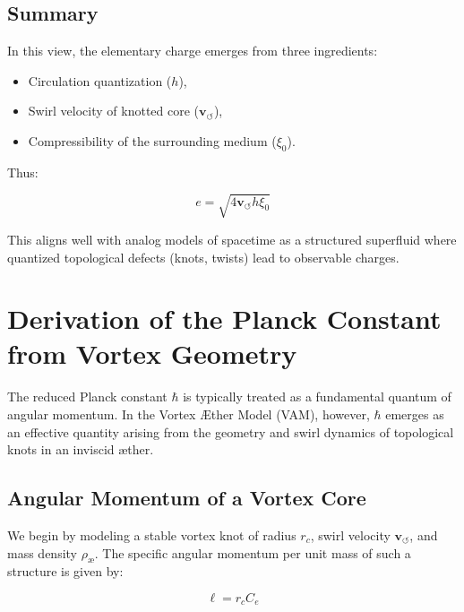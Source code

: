 \documentclass[12pt]{article}
\begin{document}
\subsection*{Summary}

In this view, the elementary charge emerges from three ingredients:

\begin{itemize}
    \item Circulation quantization (\( h \)),
    \item Swirl velocity of knotted core (\( \mathbf{v}_{\scriptscriptstyle\boldsymbol{\circlearrowleft}} \)),
    \item Compressibility of the surrounding medium (\( \xi_0 \)).
\end{itemize}

Thus:

\begin{equation}
    \boxed{e = \sqrt{4 \mathbf{v}_{\scriptscriptstyle\boldsymbol{\circlearrowleft}} h \xi_0}}
\end{equation}

This aligns well with analog models of spacetime as a structured superfluid where quantized topological defects (knots, twists) lead to observable charges.

\section{Derivation of the Planck Constant from Vortex Geometry}
\label{appendix:hbar}

The reduced Planck constant \( \hbar \) is typically treated as a fundamental quantum of angular momentum. In the Vortex Æther Model (VAM), however, \( \hbar \) emerges as an effective quantity arising from the geometry and swirl dynamics of topological knots in an inviscid æther.

\subsection{Angular Momentum of a Vortex Core}

We begin by modeling a stable vortex knot of radius \( r_c \), swirl velocity \( \mathbf{v}_{\scriptscriptstyle\boldsymbol{\circlearrowleft}} \), and mass density \( \rho_\text{\ae} \). The specific angular momentum per unit mass of such a structure is given by:

\begin{equation}
    \ell = r_c C_e
\end{equation}
\end{document}
